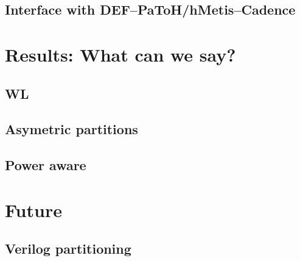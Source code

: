 \documentclass[11pt,a4paper]{article}
\theoremstyle{customdef}
\begin{document}
\subsection{Interface with DEF--PaToH/hMetis--Cadence}





\section{Results: What can we say?}
\subsection{WL}
\subsection{Asymetric partitions}
\subsection{Power aware}






\section{Future}
\subsection{Verilog partitioning}
\end{document}
